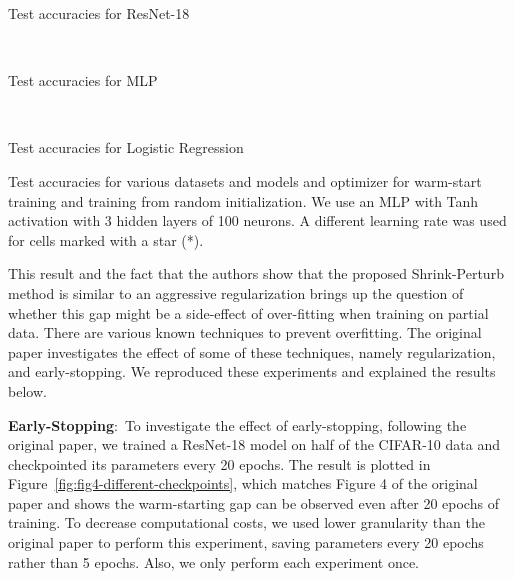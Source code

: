 \setlength{\intextsep}{5pt}%
\begin{table}

\renewcommand{\arraystretch}{1.2}
\centering
\begin{subtable} {\linewidth}
\centering
\begin{adjustbox}{max width=\linewidth}

\end{adjustbox}
\vspace{5pt}
\caption{Test accuracies for ResNet-18}
\vspace{5pt}
\end{subtable}\\
\begin{subtable} {\linewidth}
\centering
\begin{adjustbox}{max width=\linewidth}

\end{adjustbox}
\vspace{5pt}
\caption{Test accuracies for MLP}
\end{subtable}\\
\begin{subtable} {\linewidth}
\centering
\begin{adjustbox}{max width=\linewidth}

\end{adjustbox}

\caption{Test accuracies for Logistic Regression}
\end{subtable}
\caption{Test accuracies for various datasets and models and optimizer for warm-start training and training from random initialization. We use an MLP with Tanh activation with 3 hidden layers of 100 neurons. A different learning rate was used for cells marked with a star (*). }
\label{tab:offline-warmup-vs-random}
\vspace{-30pt}
\end{table}

This result and the fact that the authors show that the proposed Shrink-Perturb method is similar to an aggressive regularization brings up the question of whether this gap might be a side-effect of over-fitting when training on partial data.  There are various known techniques to prevent overfitting. The original paper investigates the effect of some of these techniques, namely regularization, and early-stopping. We reproduced these experiments and explained the results below.

\textbf{Early-Stopping}:~To investigate the effect of early-stopping, following the original paper, we trained a ResNet-18 model on half of the CIFAR-10 data and checkpointed its parameters every 20 epochs. The result is plotted in Figure~\ref{fig:fig4-different-checkpoints}, which matches Figure 4 of the original paper and shows the warm-starting gap can be observed even after 20 epochs of training. To decrease computational costs, we used lower granularity than the original paper to perform this experiment, saving parameters every 20 epochs rather than 5 epochs. Also, we only perform each experiment once. 


